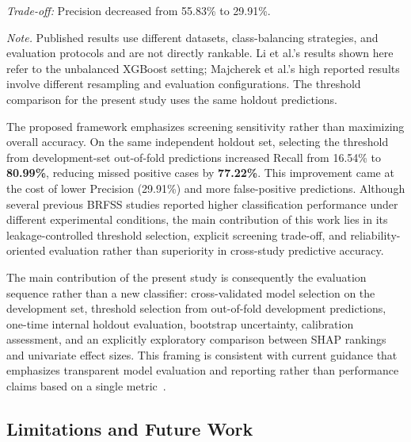 \documentclass[pdflatex,sn-basic,Numbered]{sn-jnl}
\begin{document}
\begin{table}[htbp]
\begin{minipage}{\linewidth}
\par\vspace{1mm}
\textit{Trade-off:}
Precision decreased from 55.83\% to 29.91\%.

\par\vspace{1mm}
\textit{Note.}
Published results use different datasets, class-balancing
strategies, and evaluation protocols and are not directly
rankable. Li et al.'s results shown here refer to the
unbalanced XGBoost setting; Majcherek et al.'s high
reported results involve different resampling and
evaluation configurations.
The threshold comparison for the present study uses
the same holdout predictions.
\end{minipage}

\end{table}


The proposed framework emphasizes screening sensitivity rather than maximizing overall accuracy. On the same independent holdout set, selecting the threshold from development-set out-of-fold predictions increased Recall from 16.54\% to \textbf{80.99\%}, reducing missed positive cases by \textbf{77.22\%}. This improvement came at the cost of lower Precision (29.91\%) and more false-positive predictions. Although several previous BRFSS studies reported higher classification performance under different experimental conditions, the main contribution of this work lies in its leakage-controlled threshold selection, explicit screening trade-off, and reliability-oriented evaluation rather than superiority in cross-study predictive accuracy.

The main contribution of the present study is consequently the evaluation
sequence rather than a new classifier: cross-validated model selection on the
development set, threshold selection from out-of-fold development predictions,
one-time internal holdout evaluation, bootstrap uncertainty, calibration
assessment, and an explicitly exploratory comparison between SHAP rankings and
univariate effect sizes. This framing is consistent with current guidance that
emphasizes transparent model evaluation and reporting rather than performance
claims based on a single metric~\citep{collins2024tripodai,moons2025probastai}.

\subsection{Limitations and Future Work}
\label{subsec:limitations}
\end{document}
